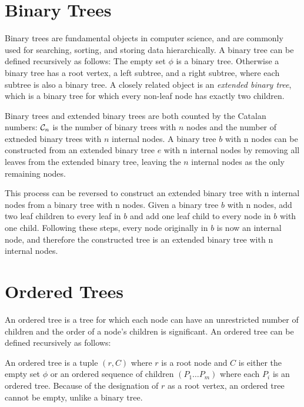 
\section{Binary Trees}

Binary trees are fundamental objects in computer science, and are commonly used for searching, sorting, and storing data hierarchically. A binary tree can be defined recursively as follows: The empty set $\phi$ is a binary tree. Otherwise a binary tree has a root vertex, a left subtree, and a right subtree, where each subtree is also a binary tree. A closely related object is an \emph{extended binary tree}, which is a binary tree for which every non-leaf node has exactly two children.  

Binary trees and extended binary trees are both counted by the Catalan numbers: $\mathcal{C}_n$ is the number of binary trees with $n$ nodes and the number of extneded binary trees with $n$ internal nodes.  
A binary tree $b$ with n nodes can be constructed from an extended binary tree $e$ with n internal nodes by removing all leaves from the extended binary tree, leaving the $n$ internal nodes as the only remaining nodes.

This process can be reversed to construct an extended binary tree with n internal nodes from a binary tree with n nodes. Given a binary tree $b$ with n nodes, add two leaf children to every leaf in $b$ and add one leaf child to every node in $b$ with one child. Following these steps, every node originally in $b$ is now an internal node, and therefore the constructed tree is an extended binary tree with n internal nodes.

\section{Ordered Trees}

An ordered tree is a tree for which each node can have an unrestricted number of children and the order of a node's children is significant.  An ordered tree can be defined recursively as follows:


An ordered tree is a tuple $(r,C)$ where $r$ is a root node and $C$ is either the empty set $\phi$ or an ordered sequence of children $(P_1\dots P_m)$ where each $P_i$ is an ordered tree.  Because of the designation of $r$ as a root vertex, an ordered tree cannot be empty, unlike a binary tree.

